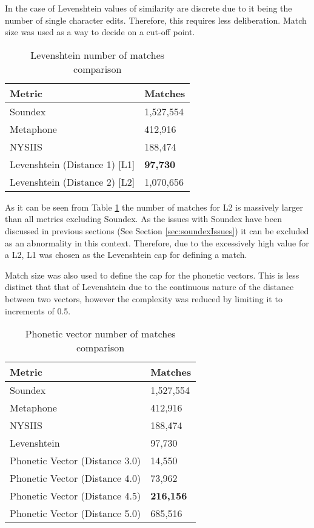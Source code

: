 In the case of Levenshtein values of similarity are discrete due to it being the number of single character edits. Therefore, this requires less deliberation. Match size was used as a way to decide on a cut-off point.

\begin{table}[h!]
    \centering
    \begin{tabular}{ll}
        Metric & Matches \\
        \hline
        Soundex     & 1,527,554 \\
        Metaphone   & 412,916 \\
        NYSIIS      & 188,474 \\
        \hline
        Levenshtein (Distance 1) [L1] & \textbf{97,730} \\
        Levenshtein (Distance 2) [L2] & 1,070,656
    \end{tabular}
    \caption{Levenshtein number of matches comparison}
    \label{tab:matchSize}
\end{table}

As it can be seen from Table \ref{tab:matchSize} the number of matches for L2 is massively larger than all metrics excluding Soundex. As the issues with Soundex have been discussed in previous sections (See Section \ref{sec:soundexIssues}) it can be excluded as an abnormality in this context. Therefore, due to the excessively high value for a L2, L1 was chosen as the Levenshtein cap for defining a match.

Match size was also used to define the cap for the phonetic vectors. This is less distinct that that of Levenshtein due to the continuous nature of the distance between two vectors, however the complexity was reduced by limiting it to increments of 0.5.

\begin{table}[h!]
    \centering
    \begin{tabular}{ll}
        Metric & Matches \\
        \hline
        Soundex     & 1,527,554 \\
        Metaphone   & 412,916 \\
        NYSIIS      & 188,474 \\
        Levenshtein & 97,730 \\
        \hline
        Phonetic Vector (Distance 3.0)  & 14,550 \\
        Phonetic Vector (Distance 4.0)  & 73,962 \\
        Phonetic Vector (Distance 4.5)  & \textbf{216,156} \\
        Phonetic Vector (Distance 5.0)  & 685,516 \\
    \end{tabular}
    \caption{Phonetic vector number of matches comparison}
    \label{tab:vectorMatchSize}
\end{table}

